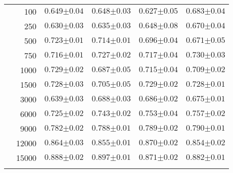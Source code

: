 \begin{landscape}
\begin{table}[p]
\begin{tabular}{cr| *{4}{C{2cm}}}
        & 100 & $0.649{\scriptscriptstyle\pm0.04}$ & $0.648{\scriptscriptstyle\pm0.03}$ & $0.627{\scriptscriptstyle\pm0.05}$ & $0.683{\scriptscriptstyle\pm0.04}$ \\
        & 250 & $0.630{\scriptscriptstyle\pm0.03}$ & $0.635{\scriptscriptstyle\pm0.03}$ & $0.648{\scriptscriptstyle\pm0.08}$ & $0.670{\scriptscriptstyle\pm0.04}$ \\
        & 500 & $0.723{\scriptscriptstyle\pm0.01}$ & $0.714{\scriptscriptstyle\pm0.01}$ & $0.696{\scriptscriptstyle\pm0.04}$ & $0.671{\scriptscriptstyle\pm0.05}$ \\
        & 750 & $0.716{\scriptscriptstyle\pm0.01}$ & $0.727{\scriptscriptstyle\pm0.02}$ & $0.717{\scriptscriptstyle\pm0.04}$ & $0.730{\scriptscriptstyle\pm0.03}$ \\
        & 1000 & $0.729{\scriptscriptstyle\pm0.02}$ & $0.687{\scriptscriptstyle\pm0.05}$ & $0.715{\scriptscriptstyle\pm0.04}$ & $0.709{\scriptscriptstyle\pm0.02}$ \\
        & 1500 & $0.728{\scriptscriptstyle\pm0.03}$ & $0.705{\scriptscriptstyle\pm0.05}$ & $0.729{\scriptscriptstyle\pm0.02}$ & $0.728{\scriptscriptstyle\pm0.01}$ \\
        & 3000 & $0.639{\scriptscriptstyle\pm0.03}$ & $0.688{\scriptscriptstyle\pm0.03}$ & $0.686{\scriptscriptstyle\pm0.02}$ & $0.675{\scriptscriptstyle\pm0.01}$ \\
        & 6000 & $0.725{\scriptscriptstyle\pm0.02}$ & $0.743{\scriptscriptstyle\pm0.02}$ & $0.753{\scriptscriptstyle\pm0.04}$ & $0.757{\scriptscriptstyle\pm0.02}$ \\
        & 9000 & $0.782{\scriptscriptstyle\pm0.02}$ & $0.788{\scriptscriptstyle\pm0.01}$ & $0.789{\scriptscriptstyle\pm0.02}$ & $0.790{\scriptscriptstyle\pm0.01}$ \\
        & 12000 & $0.864{\scriptscriptstyle\pm0.03}$ & $0.855{\scriptscriptstyle\pm0.01}$ & $0.870{\scriptscriptstyle\pm0.02}$ & $0.854{\scriptscriptstyle\pm0.02}$ \\
        & 15000 & $0.888{\scriptscriptstyle\pm0.02}$ & $\mathbf{0.897{\scriptscriptstyle\pm0.01}}$ & $0.871{\scriptscriptstyle\pm0.02}$ & $0.882{\scriptscriptstyle\pm0.01}$ \\
                
    \end{tabular}
\end{table}


\end{landscape}
